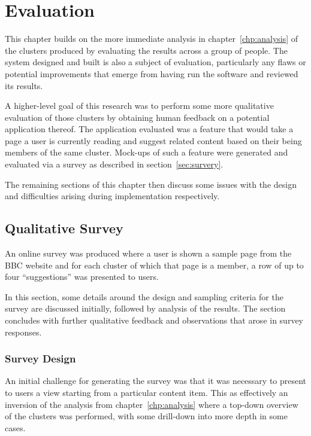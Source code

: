 \chapter{Evaluation}
\label{chp:evaluation}

This chapter builds on the more immediate analysis in
chapter~\ref{chp:analysis} of the clusters produced by evaluating the
results across a group of people. The system designed and built is
also a subject of evaluation, particularly any flaws or potential
improvements that emerge from having run the software and reviewed its
results.

A higher-level
goal of this research was to perform some more qualitative evaluation
of those clusters by obtaining human feedback on a potential
application thereof. The application evaluated was a feature that would
take a page a user is currently reading and suggest related content
based on their being members of the same cluster. Mock-ups of such
a feature were generated and evaluated via a survey as described
in section~\ref{sec:survery}.

The remaining sections of this chapter then discuss some issues with
the design and difficulties arising during implementation
respectively.

\section{Qualitative Survey}
\label{sec:survey}

An online survey was produced where a user is shown a sample page
from the BBC website and for each cluster of which that page is
a member, a row of up to four ``suggestions'' was presented to users.

In this section, some details around the design and sampling criteria
for the survey are discussed initially, followed by analysis of the
results. The section concludes with further qualitative feedback and
observations that arose in survey responses.

\subsection{Survey Design}

An initial challenge for generating the survey was that it was
necessary to present to users a view starting from a particular
content item. This as effectively an inversion of the analysis
from chapter~\ref{chp:analysis} where a top-down overview of the
clusters was performed, with some drill-down into more depth in some
cases.

